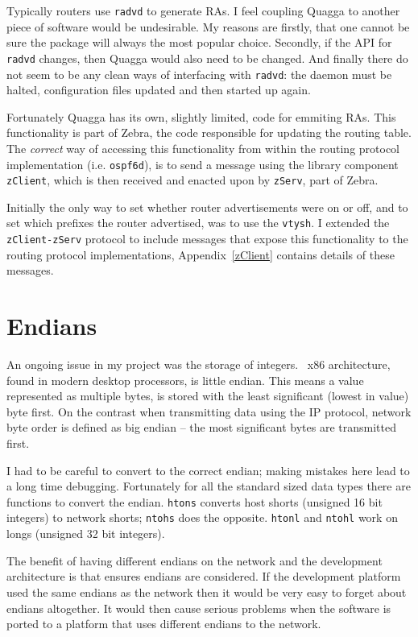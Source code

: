 \documentclass[12pt,a4paper,twoside]{report}
\begin{document}
Typically routers use \texttt{radvd}  to generate RAs. I feel coupling Quagga to another
piece of software would be undesirable. My reasons are firstly, that one cannot
be sure the package will always the most popular choice. Secondly, if the
API for \texttt{radvd} changes, then Quagga would also need to be changed. And
finally there do not seem to be any clean ways of interfacing with
\texttt{radvd}: the daemon must be halted, configuration files updated and then
started up again.

Fortunately Quagga has its own, slightly limited, code for emmiting RAs. This
functionality is part of Zebra, the code responsible for updating the routing
table. The \emph{correct} way of accessing this functionality from within the
routing protocol implementation (i.e. \texttt{ospf6d}), is to send a message
using the library component \texttt{zClient}, which is then received and
enacted upon by \texttt{zServ}, part of Zebra. 

Initially the only way to set whether router advertisements were on or off, and
to set which prefixes the router advertised, was to use the \texttt{vtysh}. I
extended the \texttt{zClient-zServ} protocol to include messages that expose
this functionality to the routing protocol implementations,
Appendix~\ref{zClient} contains details of these messages. 

\section{Endians}
An ongoing issue in my project was the storage of integers.
\ x86 architecture, found in modern desktop processors, is little endian.
This means a value represented as multiple bytes, is stored with the least
significant (lowest in value) byte first. On the contrast
when transmitting data using the IP protocol, network byte order
is defined as big endian -- the most significant bytes are transmitted
first. 

I had to be careful to convert to the correct endian; making mistakes here lead
to a long time debugging. Fortunately for all the standard sized data types
there are functions to convert the endian.  \texttt{htons} converts host shorts
(unsigned 16 bit integers) to network shorts; \texttt{ntohs} does the opposite.
\texttt{htonl} and \texttt{ntohl} work on longs (unsigned 32 bit integers). 

The benefit of having different endians on the network and the development
architecture is that ensures endians are considered. If the development platform
used the same endians as the network then it would be very easy to forget about
endians altogether. It would then cause serious problems when the software is
ported to a platform that uses different endians to the network.
    
\end{document}
